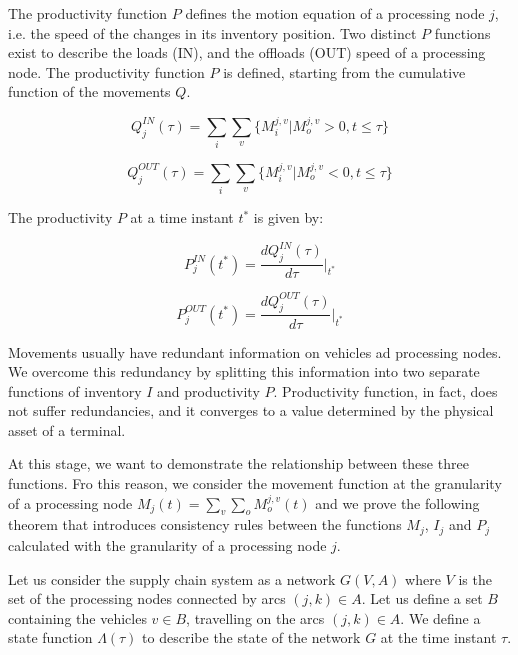 The productivity function $P$ defines the motion equation of a processing node $j$, i.e. the speed of the changes in its inventory position. Two distinct $P$ functions exist to describe the loads (IN), and the offloads (OUT) speed of a processing node. The productivity function $P$ is defined, starting from the cumulative function of the movements $Q$.

\begin{equation}
Q_j^{IN}(\tau)=\sum_{i}\sum_{v}\{M_i^{j,v}|M_o^{j,v}>0,t\leq \tau \}
\label{eqQIN}
\end{equation}

\begin{equation}
Q_j^{OUT}(\tau)=\sum_{i}\sum_{v}\{M_i^{j,v}|M_o^{j,v}<0,t\leq \tau \}
\label{eqQOUT}
\end{equation}

The productivity $P$ at a time instant $t^\ast$ is given by:

\begin{equation}
P_j^{IN} (t^* )=\frac{dQ_j^{IN} (\tau)}{d\tau}\vert_{t^*}
\label{eqProdIN}
\end{equation}

\begin{equation}
P_j^{OUT} (t^* )=\frac{dQ_j^{OUT} (\tau)}{d\tau}\vert_{t^*}
\label{eqProdOUT}
\end{equation}

Movements usually have redundant information on vehicles ad processing nodes. We overcome this redundancy by splitting this information into two separate functions of inventory $I$ and productivity $P$. Productivity function, in fact, does not suffer redundancies, and it converges to a value determined by the physical asset of a terminal. \par

At this stage, we want to demonstrate the relationship between these three functions. Fro this reason, we consider the movement function at the granularity of a processing node $M_j(t)=\sum_{v}\sum_{o}{M_o^{j,v}(t)}$  and we prove the following theorem that introduces consistency rules between the functions $M_j$, $I_j$ and $P_j$ calculated with the granularity of a processing node $j$. \par

Let us consider the supply chain system as a network $G(V,A)$ where $V$ is the set of the processing nodes connected by arcs $(j,k)\in A$. Let us define a set $B$ containing the vehicles $v\in B$, travelling on the arcs $(j,k)\in A$. We define a state function $\Lambda(\tau)$ to describe the state of the network $G$ at the time instant $\tau$.   


